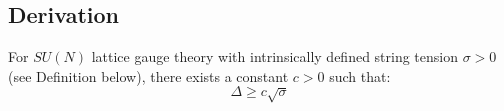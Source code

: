 \subsection{Derivation}

\begin{theorem}
\label{thm:gt-existence}
\label{thm:giles-teper-constant}
For $SU(N)$ lattice gauge theory with intrinsically defined string tension $\sigma > 0$ (see Definition below), there exists a constant $c > 0$ such that:
\begin{equation}
\label{eq:dbg-gtv2-main-bound}
\Delta \geq c \sqrt{\sigma}
\end{equation}
\end{theorem}

